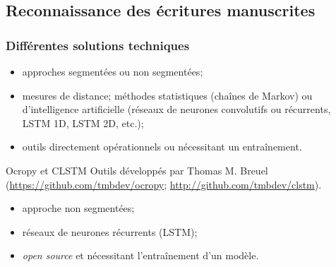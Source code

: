 \documentclass[ignorenonframetext]{beamer}
\begin{document}
\subsection{Reconnaissance des écritures manuscrites}

\begin{frame}
\frametitle{Différentes solutions techniques}


\begin{itemize}
\item approches segmentées ou non segmentées;
\item mesures de distance; méthodes statistiques (chaînes de Markov) ou d'intelligence artificielle (réseaux de neurones convolutifs ou récurrents, LSTM 1D, LSTM 2D, etc.);
\item outils directement opérationnels ou nécessitant un entraînement.
\end{itemize}


\begin{block}{Ocropy et CLSTM}
Outils développés par Thomas M. Breuel (\url{https://github.com/tmbdev/ocropy}; \url{http://github.com/tmbdev/clstm}).
\begin{itemize}
\item approche non segmentées;
\item réseaux de neurones récurrents (LSTM);
\item \textit{open source} et nécessitant l'entraînement d'un modèle.
\end{itemize}
\end{block}

\end{frame}
\end{document}
